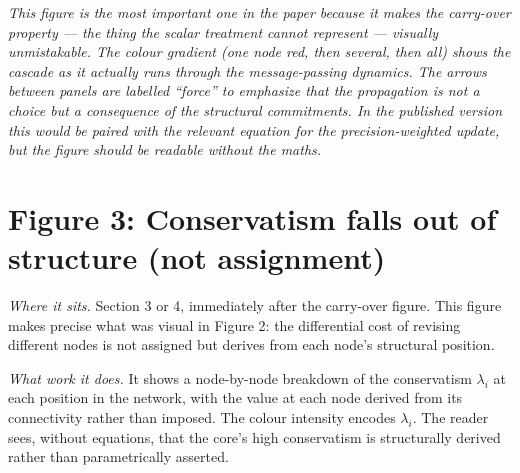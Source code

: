 \documentclass[11pt]{article}
\begin{document}
\begin{center}
\end{center}

\noindent\textit{\textcolor{notegrey}{This figure is the most important one in the paper because it makes the carry-over property — the thing the scalar treatment cannot represent — visually unmistakable. The colour gradient (one node red, then several, then all) shows the cascade as it actually runs through the message-passing dynamics. The arrows between panels are labelled ``force'' to emphasize that the propagation is not a choice but a consequence of the structural commitments. In the published version this would be paired with the relevant equation for the precision-weighted update, but the figure should be readable without the maths.}}

\newpage
\section*{Figure 3: Conservatism falls out of structure (not assignment)}

\textit{Where it sits.} Section 3 or 4, immediately after the carry-over figure. This figure makes precise what was visual in Figure 2: the differential cost of revising different nodes is not assigned but derives from each node's structural position.

\textit{What work it does.} It shows a node-by-node breakdown of the conservatism $\lambda_i$ at each position in the network, with the value at each node derived from its connectivity rather than imposed. The colour intensity encodes $\lambda_i$. The reader sees, without equations, that the core's high conservatism is structurally derived rather than parametrically asserted.
\end{document}
